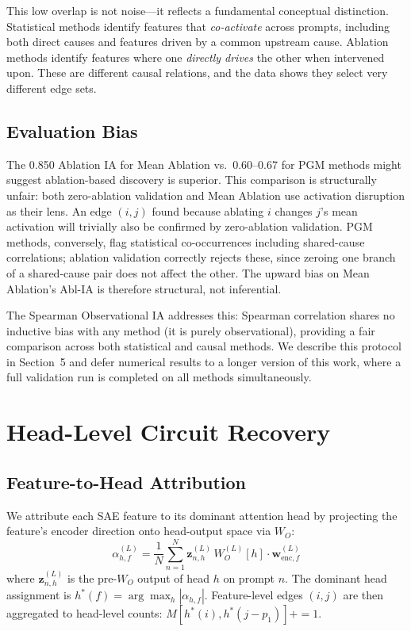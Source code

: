 \documentclass{article}
\begin{document}
This low overlap is not noise---it reflects a fundamental conceptual
distinction. Statistical methods identify features that \emph{co-activate}
across prompts, including both direct causes and features driven by a common
upstream cause. Ablation methods identify features where one \emph{directly
drives} the other when intervened upon. These are different causal relations,
and the data shows they select very different edge sets.

\subsection{Evaluation Bias}
\label{sec:bias}

The 0.850 Ablation IA for Mean Ablation vs.\ 0.60--0.67 for PGM methods might
suggest ablation-based discovery is superior. This comparison is structurally
unfair: both zero-ablation validation and Mean Ablation use activation
disruption as their lens. An edge $(i,j)$ found because ablating $i$ changes
$j$'s mean activation will trivially also be confirmed by zero-ablation
validation. PGM methods, conversely, flag statistical co-occurrences including
shared-cause correlations; ablation validation correctly rejects these, since
zeroing one branch of a shared-cause pair does not affect the other. The
upward bias on Mean Ablation's Abl-IA is therefore structural, not inferential.

The Spearman Observational IA addresses this: Spearman correlation shares no
inductive bias with any method (it is purely observational), providing a fair
comparison across both statistical and causal methods. We describe this
protocol in Section~5 and defer numerical results to a longer version of this
work, where a full validation run is completed on all methods simultaneously.

\section{Head-Level Circuit Recovery}

\subsection{Feature-to-Head Attribution}

We attribute each SAE feature to its dominant attention head by projecting the
feature's encoder direction onto head-output space via $W_O$:
\[
  \alpha_{h,f}^{(L)} = \frac{1}{N}\sum_{n=1}^{N}
  \mathbf{z}_{n,h}^{(L)}\,W_O^{(L)}[h]\cdot\mathbf{w}_{\text{enc},f}^{(L)}
\]
where $\mathbf{z}_{n,h}^{(L)}$ is the pre-$W_O$ output of head $h$ on prompt
$n$. The dominant head assignment is $h^*(f) = \arg\max_h |\alpha_{h,f}|$.
Feature-level edges $(i,j)$ are then aggregated to head-level counts:
$M[h^*(i), h^*(j{-}p_1)] {+}{=} 1$.
\end{document}
